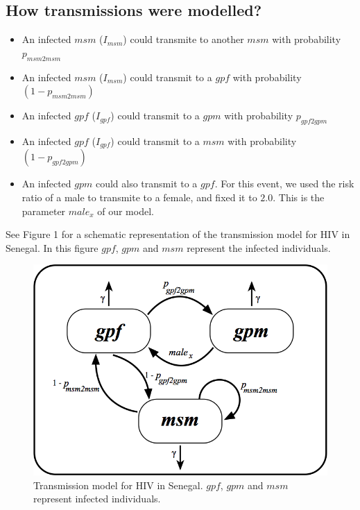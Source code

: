 \documentclass[12pt,]{article}
\providecommand{\tightlist}{%
  \setlength{\itemsep}{0pt}\setlength{\parskip}{0pt}}
\begin{document}
\hypertarget{how-transmissions-were-modelled}{%
\subsection{How transmissions were
modelled?}\label{how-transmissions-were-modelled}}

\begin{itemize}
\tightlist
\item
  An infected \(msm\) (\(I_{msm}\)) could transmite to another \(msm\)
  with probability \(p_{msm2msm}\)
\item
  An infected \(msm\) (\(I_{msm}\)) could transmit to a \(gpf\) with
  probability \((1 - p_{msm2msm})\)
\item
  An infected \(gpf\) (\(I_{gpf}\)) could transmit to a \(gpm\) with
  probability \(p_{gpf2gpm}\)
\item
  An infected \(gpf\) (\(I_{gpf}\)) could transmit to a \(msm\) with
  probability \((1 - p_{gpf2gpm})\)
\item
  An infected \(gpm\) could also transmit to a \(gpf\). For this event,
  we used the risk ratio of a male to transmite to a female, and fixed
  it to \(2.0\). This is the parameter \(male_{x}\) of our model.
\end{itemize}

See Figure 1 for a schematic representation of the transmission model
for HIV in Senegal. In this figure \(gpf\), \(gpm\) and \(msm\)
represent the infected individuals.

\begin{figure}

{\centering \includegraphics[width=1\linewidth]{images/SN_model_v2} 

}

\caption{Transmission model for HIV in Senegal. $gpf$, $gpm$ and $msm$ represent infected individuals.}\label{fig:unnamed-chunk-2}
\end{figure}
\end{document}
